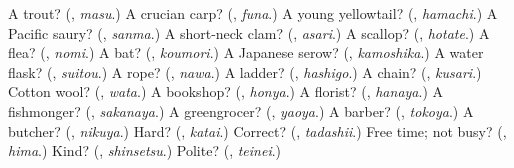 \begin{tcolorbox}[breakable,colback=teal!4,colframe=teal!35!black,title={Before you move on}]
A trout? (\textbf{}, \emph{masu}.) A crucian carp? (\textbf{}, \emph{funa}.) A young yellowtail? (\textbf{}, \emph{hamachi}.) A Pacific saury? (\textbf{}, \emph{sanma}.) A short-neck clam? (\textbf{}, \emph{asari}.) A scallop? (\textbf{}, \emph{hotate}.) A flea? (\textbf{}, \emph{nomi}.) A bat? (\textbf{}, \emph{koumori}.) A Japanese serow? (\textbf{}, \emph{kamoshika}.) A water flask? (\textbf{}, \emph{suitou}.) A rope? (\textbf{}, \emph{nawa}.) A ladder? (\textbf{}, \emph{hashigo}.) A chain? (\textbf{}, \emph{kusari}.) Cotton wool? (\textbf{}, \emph{wata}.) A bookshop? (\textbf{}, \emph{honya}.) A florist? (\textbf{}, \emph{hanaya}.) A fishmonger? (\textbf{}, \emph{sakanaya}.) A greengrocer? (\textbf{}, \emph{yaoya}.) A barber? (\textbf{}, \emph{tokoya}.) A butcher? (\textbf{}, \emph{nikuya}.) Hard? (\textbf{}, \emph{katai}.) Correct? (\textbf{}, \emph{tadashii}.) Free time; not busy? (\textbf{}, \emph{hima}.) Kind? (\textbf{}, \emph{shinsetsu}.) Polite? (\textbf{}, \emph{teinei}.)
\end{tcolorbox}
